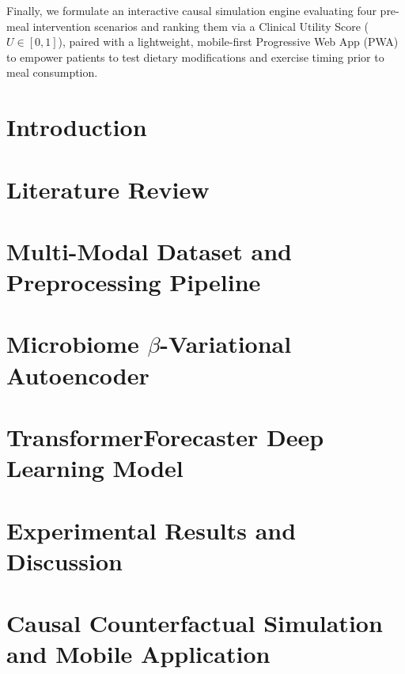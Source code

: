 \documentclass[a4paper, 12pt]{report}
\theoremstyle{definition}
\begin{document}
    Finally, we formulate an interactive causal simulation engine evaluating four pre-meal intervention scenarios and ranking them via a Clinical Utility Score ($U \in [0, 1]$), paired with a lightweight, mobile-first Progressive Web App (PWA) to empower patients to test dietary modifications and exercise timing prior to meal consumption.

	\clearpage
	\setcounter{page}{1}

	\chapter{Introduction}
	

	\chapter{Literature Review}
	

	\chapter{Multi-Modal Dataset and Preprocessing Pipeline}
	

	\chapter{Microbiome $\beta$-Variational Autoencoder}
	 

	\chapter{TransformerForecaster Deep Learning Model}
	

	\chapter{Experimental Results and Discussion}
	

	\chapter{Causal Counterfactual Simulation and Mobile Application}
	
\end{document}
